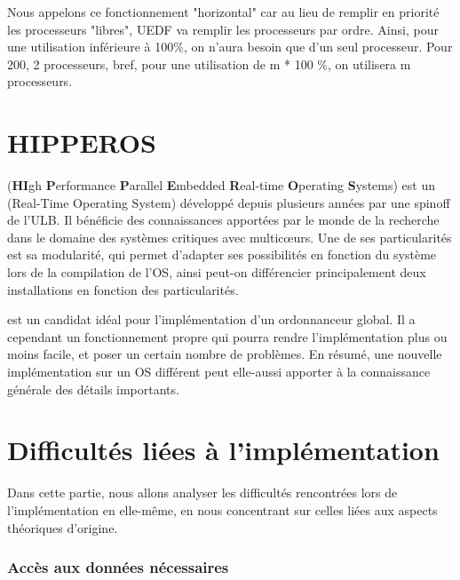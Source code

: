 		
		
		Nous appelons ce fonctionnement "horizontal" car au lieu de remplir 
		en priorité les processeurs "libres", UEDF va remplir les 
		processeurs par ordre. Ainsi, pour une utilisation inférieure à 100\%, 
		on n'aura besoin que d'un seul processeur. Pour 200, 2 processeurs, bref, 
		pour une utilisation de m * 100 \%, on utilisera m processeurs.
		
		
\section{HIPPEROS}
	 (\textbf{HI}gh \textbf{P}erformance \textbf{P}arallel \textbf{E}mbedded \textbf{R}eal-time \textbf{O}perating \textbf{S}ystems)
	est un  (Real-Time Operating System) développé depuis plusieurs années par une spinoff de l'ULB.
	Il bénéficie des connaissances apportées par le monde de la recherche dans 
	le domaine des systèmes critiques avec multic\oe{}urs. Une de ses particularités 
	est sa modularité, qui permet d'adapter ses possibilités en fonction du système 
	lors de la compilation de l'OS, ainsi peut-on différencier principalement 
	deux installations en fonction des particularités. 
	
	 est un candidat idéal pour l'implémentation d'un ordonnanceur 
	global. Il a cependant un fonctionnement propre qui pourra rendre l'implémentation 
	plus ou moins facile, et poser un certain nombre de problèmes. 
	En résumé, une nouvelle implémentation sur un OS différent 
	peut elle-aussi apporter à la connaissance générale des détails importants.
		

\section{Difficultés liées à l'implémentation}

	Dans cette partie, nous allons analyser les difficultés rencontrées lors de l'implémentation en elle-même, 
	en nous concentrant sur celles liées aux aspects théoriques d'origine. 

	\subsubsection{Accès aux données nécessaires}
	
